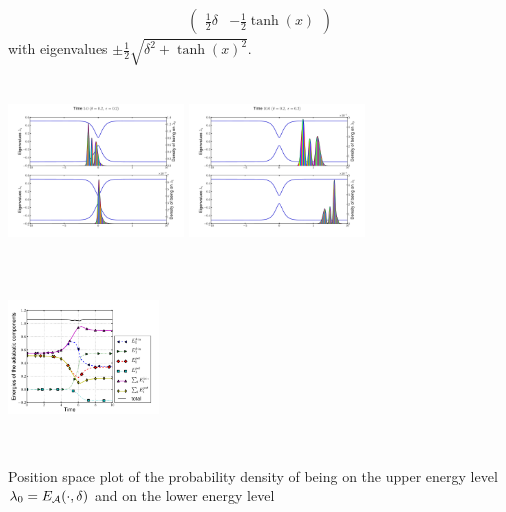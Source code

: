 \documentclass[b0paper,portrait,fontscale=0.24]{baposter}
\begin{document}
\begin{poster}
{\begin{minipage}[c]{.5\linewidth}
\begin{eqnarray*}
\begin{pmatrix}
          \frac12\delta   & -\frac12\tanh(x)
        \end{pmatrix}
      \end{eqnarray*}
      with eigenvalues $\pm\frac12\sqrt{\delta^{2}+\tanh(x)^{2}}$.
    \end{minipage}
    \centerline{
      \includegraphics[width=0.35\textwidth,height=13em]{ParametersHeps0_2d1_0eS2PotAndWwave00250.pdf}
      \includegraphics[width=0.35\textwidth,height=13em]{ParametersHeps0_2d1_0eS2PotAndWwave00500.pdf}
      \includegraphics[width=0.3\textwidth,height=13em]{ParametersHeps0_2d1_0eS2energies.pdf}
    }
    { Position space plot of the probability density of being on the upper energy level
      $\lambda_{0} = E_{\cal A}(\cdot,\delta)$ and on the lower energy level
}}
\end{poster}
\end{document}
